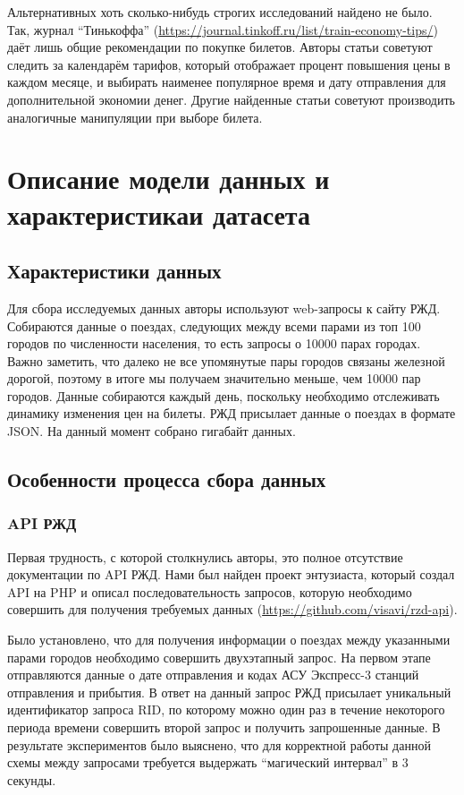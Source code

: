 \documentclass[conference]{IEEEtran}
\begin{document}
Альтернативных хоть сколько-нибудь строгих исследований найдено не было. Так, журнал ``Тинькоффа'' (\href{https://journal.tinkoff.ru/list/train-economy-tips/}{https://journal.tinkoff.ru/list/train-economy-tips/})
даёт лишь общие рекомендации по покупке билетов. Авторы статьи советуют следить за календарём тарифов, который отображает процент повышения цены в каждом месяце, и выбирать наименее популярное время и дату отправления для дополнительной экономии денег. Другие найденные статьи советуют производить аналогичные манипуляции при выборе билета.

\section{Описание модели данных и характеристикаи датасета}
\subsection{Характеристики данных}

Для сбора исследуемых данных авторы используют web-запросы к сайту РЖД. Собираются данные о поездах, следующих между всеми парами из топ 100 городов по численности населения, то есть запросы о 10000 парах городах. Важно заметить, что далеко не все упомянутые пары городов связаны железной дорогой, поэтому в итоге мы получаем значительно меньше, чем 10000 пар городов. Данные собираются каждый день, поскольку необходимо отслеживать динамику изменения цен на билеты. РЖД присылает данные о поездах в формате JSON. На данный момент собрано %
гигабайт данных.

\subsection{Особенности процесса сбора данных}

\subsubsection{API РЖД}
Первая трудность, с которой столкнулись авторы, это полное отсутствие документации по API РЖД. Нами был найден проект энтузиаста, который создал API на PHP и описал последовательность запросов, которую необходимо совершить для получения требуемых данных (\href{https://github.com/visavi/rzd-api}{https://github.com/visavi/rzd-api}).

Было установлено, что для получения информации о поездах между указанными парами городов необходимо совершить двухэтапный запрос. На первом этапе отправляются данные о дате отправления и кодах АСУ Экспресс-3 станций отправления и прибытия. В ответ на данный запрос РЖД присылает уникальный идентификатор запроса RID, по которому можно один раз в течение некоторого периода времени совершить второй запрос и получить запрошенные данные. В результате экспериментов было выяснено, что для корректной работы данной схемы между запросами требуется выдержать ``магический интервал'' в 3 секунды.
\end{document}
